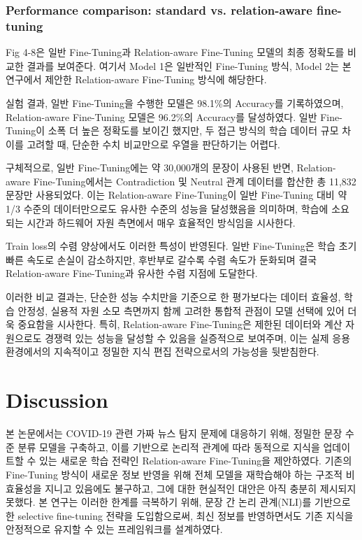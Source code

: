 \documentclass[a4paper,fleqn]{cas-sc}
\begin{document}
\subsubsection{Performance comparison: standard vs. relation-aware fine-tuning}

Fig 4-8은 일반 Fine-Tuning과 Relation-aware Fine-Tuning 모델의 최종 정확도를 비교한 결과를 보여준다. 여기서 Model 1은 일반적인 Fine-Tuning 방식, Model 2는 본 연구에서 제안한 Relation-aware Fine-Tuning 방식에 해당한다.

실험 결과, 일반 Fine-Tuning을 수행한 모델은 98.1\%의 Accuracy를 기록하였으며, Relation-aware Fine-Tuning 모델은 96.2\%의 Accuracy를 달성하였다. 일반 Fine-Tuning이 소폭 더 높은 정확도를 보이긴 했지만, 두 접근 방식의 학습 데이터 규모 차이를 고려할 때, 단순한 수치 비교만으로 우열을 판단하기는 어렵다.

구체적으로, 일반 Fine-Tuning에는 약 30,000개의 문장이 사용된 반면, Relation-aware Fine-Tuning에서는 Contradiction 및 Neutral 관계 데이터를 합산한 총 11,832문장만 사용되었다. 이는 Relation-aware Fine-Tuning이 일반 Fine-Tuning 대비 약 1/3 수준의 데이터만으로도 유사한 수준의 성능을 달성했음을 의미하며, 학습에 소요되는 시간과 하드웨어 자원 측면에서 매우 효율적인 방식임을 시사한다.

Train loss의 수렴 양상에서도 이러한 특성이 반영된다. 일반 Fine-Tuning은 학습 초기 빠른 속도로 손실이 감소하지만, 후반부로 갈수록 수렴 속도가 둔화되며 결국 Relation-aware Fine-Tuning과 유사한 수렴 지점에 도달한다. 

이러한 비교 결과는, 단순한 성능 수치만을 기준으로 한 평가보다는 데이터 효율성, 학습 안정성, 실용적 자원 소모 측면까지 함께 고려한 통합적 관점이 모델 선택에 있어 더욱 중요함을 시사한다. 특히, Relation-aware Fine-Tuning은 제한된 데이터와 계산 자원으로도 경쟁력 있는 성능을 달성할 수 있음을 실증적으로 보여주며, 이는 실제 응용 환경에서의 지속적이고 정밀한 지식 편집 전략으로서의 가능성을 뒷받침한다.


\section{Discussion}

본 논문에서는 COVID-19 관련 가짜 뉴스 탐지 문제에 대응하기 위해, 정밀한 문장 수준 분류 모델을 구축하고, 이를 기반으로 논리적 관계에 따라 동적으로 지식을 업데이트할 수 있는 새로운 학습 전략인 Relation-aware Fine-Tuning을 제안하였다. 기존의 Fine-Tuning 방식이 새로운 정보 반영을 위해 전체 모델을 재학습해야 하는 구조적 비효율성을 지니고 있음에도 불구하고, 그에 대한 현실적인 대안은 아직 충분히 제시되지 못했다. 본 연구는 이러한 한계를 극복하기 위해, 문장 간 논리 관계(NLI)를 기반으로 한 selective fine-tuning 전략을 도입함으로써, 최신 정보를 반영하면서도 기존 지식을 안정적으로 유지할 수 있는 프레임워크를 설계하였다.
\end{document}

